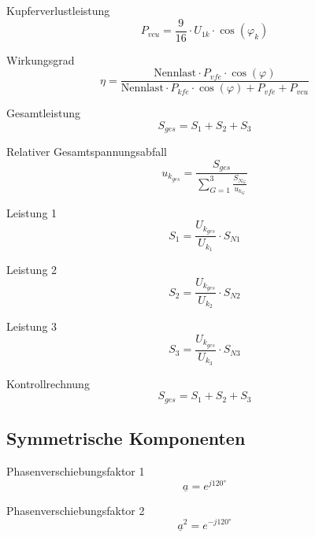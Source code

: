 \documentclass[11pt, a4paper, final, fleqn, twocolumn]{article}
\numberwithin{equation}{subsection}
\begin{document}
\noindent Kupferverlustleistung
\begin{equation}
    P_{vcu} = \frac{9}{16} \cdot U_{1k} \cdot \cos(\varphi_k)
\end{equation}

\noindent Wirkungsgrad
\begin{equation}
    \eta = \frac{\text{Nennlast} \cdot P_{vfe} \cdot \cos(\varphi)}{\text{Nennlast} \cdot P_{kfe} \cdot \cos(\varphi) + P_{vfe} + P_{vcu}}
\end{equation}

\noindent Gesamtleistung
\begin{equation}
    S_{ges} = S_1 + S_2 + S_3
\end{equation}

\noindent Relativer Gesamtspannungsabfall
\begin{equation}
    u_{k_{ges}} = \frac{S_{ges}}{\sum_{G=1}^{3} \frac{S_{N_{G}}}{u_{k_{G}}}}
\end{equation}

\noindent Leistung 1
\begin{equation}
    S_1 = \frac{U_{k_{ges}}}{U_{k_{1}}} \cdot S_{N1}
\end{equation}

\noindent Leistung 2
\begin{equation}
    S_2 = \frac{U_{k_{ges}}}{U_{k_{2}}} \cdot S_{N2}
\end{equation}

\noindent Leistung 3
\begin{equation}
    S_3 = \frac{U_{k_{ges}}}{U_{k_{3}}} \cdot S_{N3}
\end{equation}

\noindent Kontrollrechnung
\begin{equation}
    S_{ges} = S_1 + S_2 + S_3
\end{equation}


\subsection{Symmetrische Komponenten}

Phasenverschiebungsfaktor 1
\begin{equation}
    \underline{a} = e^{j120\text{°}}
\end{equation}

\noindent Phasenverschiebungsfaktor 2
\begin{equation}
    \underline{a}^2 = e^{-j120\text{°}}
\end{equation}
\end{document}
